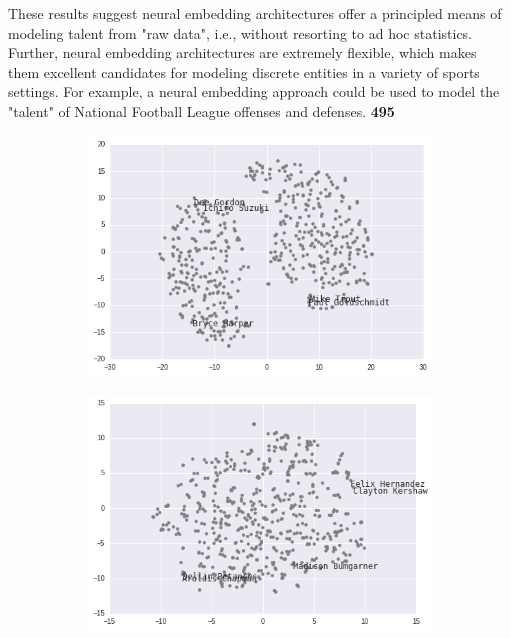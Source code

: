 \documentclass{article}
\begin{document}
These results suggest neural embedding architectures offer a principled means of modeling talent from "raw data", i.e., without resorting to ad hoc statistics. Further, neural embedding architectures are extremely flexible, which makes them excellent candidates for modeling discrete entities in a variety of sports settings. For example, a neural embedding approach could be used to model the "talent" of National Football League offenses and defenses. \textbf{495}

\begin{figure}[h]
\centering
\begin{minipage}{.5\textwidth}
\captionsetup[subfigure]{labelformat=empty}
\centering

    \begin{subfigure}[b]{0.75\textwidth}
    \includegraphics[width=1\linewidth]{batter_tsne.png}
    \caption{}
    \end{subfigure}

    \begin{subfigure}[b]{0.75\textwidth}
    \includegraphics[width=1\linewidth]{pitcher_tsne.png}
    \caption{}
    \end{subfigure}


\end{minipage}
\end{figure}
\end{document}
